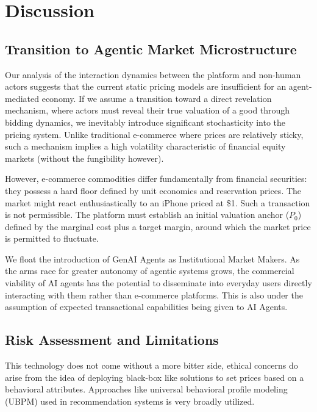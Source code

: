 \section{Discussion}

\subsection{Transition to Agentic Market Microstructure}

Our analysis of the interaction dynamics between the platform and non-human actors suggests that the current static pricing models are insufficient for an agent-mediated economy. If we assume a transition toward a direct revelation mechanism, where actors must reveal their true valuation of a good through bidding dynamics, we inevitably introduce significant stochasticity into the pricing system. Unlike traditional e-commerce where prices are relatively sticky, such a mechanism implies a high volatility characteristic of financial equity markets (without the fungibility however).

However, e-commerce commodities differ fundamentally from financial securities: they possess a hard floor defined by unit economics and reservation prices. The market might react enthusiastically to an iPhone priced at \$1. Such a transaction is not permissible. The platform must establish an initial valuation anchor ($P_0$) defined by the marginal cost plus a target margin, around which the market price is permitted to fluctuate.

We float the introduction of GenAI Agents as Institutional Market Makers. As the arms race for greater autonomy of agentic systems grows, the commercial viability of AI agents has the potential to disseminate into everyday users directly interacting with them rather than e-commerce platforms. This is also under the assumption of expected transactional capabilities being given to AI Agents.

\subsection{Risk Assessment and Limitations}

This technology does not come without a more bitter side, ethical concerns do arise from the idea of deploying black-box like solutions to set prices based on a behavioral attributes. Approaches like universal behavioral profile modeling (UBPM) used in recommendation systems is very broadly utilized.

